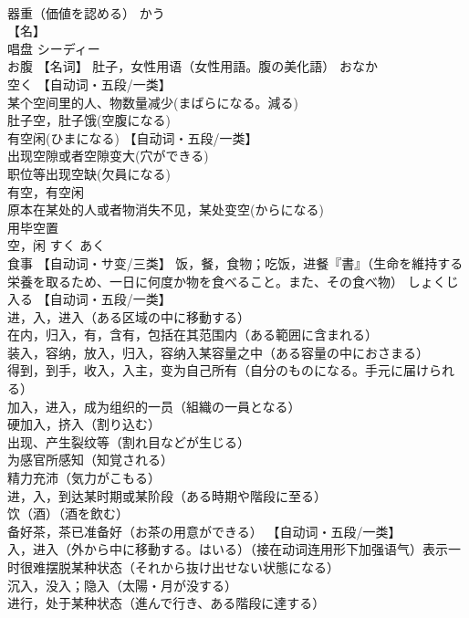 \documentclass[8pt]{extreport}
\begin{document}
\begin{CJK}{UTF8}{min}
\\	器重（価値を認める）	かう	
\\	【名】 
\\	唱盘	シーディー	
\\	お腹	【名词】 肚子，女性用语（女性用語。腹の美化語）	おなか	
\\	空く	【自动词・五段/一类】 
\\	某个空间里的人、物数量减少(まばらになる。減る) 
\\	肚子空，肚子饿(空腹になる) 
\\	有空闲(ひまになる) 【自动词・五段/一类】 
\\	出现空隙或者空隙变大(穴ができる) 
\\	职位等出现空缺(欠員になる) 
\\	有空，有空闲 
\\	原本在某处的人或者物消失不见，某处变空(からになる) 
\\	用毕空置 
\\	空，闲	すく あく	
\\	食事	【自动词・サ变/三类】 饭，餐，食物；吃饭，进餐『書』（生命を維持する栄養を取るため、一日に何度か物を食べること。また、その食べ物）	しょくじ	
\\	入る	【自动词・五段/一类】 
\\	进，入，进入（ある区域の中に移動する） 
\\	在内，归入，有，含有，包括在其范围内（ある範囲に含まれる） 
\\	装入，容纳，放入，归入，容纳入某容量之中（ある容量の中におさまる） 
\\	得到，到手，收入，入主，变为自己所有（自分のものになる。手元に届けられる） 
\\	加入，进入，成为组织的一员（組織の一員となる） 
\\	硬加入，挤入（割り込む） 
\\	出现、产生裂纹等（割れ目などが生じる） 
\\	为感官所感知（知覚される） 
\\	精力充沛（気力がこもる） 
\\	进，入，到达某时期或某阶段（ある時期や階段に至る） 
\\	饮（酒）（酒を飲む） 
\\	备好茶，茶已准备好（お茶の用意ができる） 【自动词・五段/一类】 
\\	入，进入（外から中に移動する。はいる）（接在动词连用形下加强语气）表示一时很难摆脱某种状态（それから抜け出せない状態になる） 
\\	沉入，没入；隐入（太陽・月が没する） 
\\	进行，处于某种状态（進んで行き、ある階段に達する） 

\end{CJK}
\end{document}
